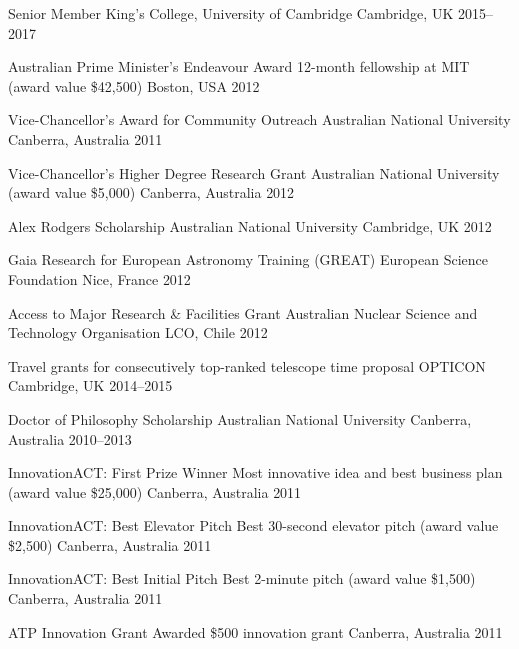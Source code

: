 


\begin{cvhonors}

  \cvhonor
    {Senior Member} 
    {King's College, University of Cambridge}
    {Cambridge, UK}
    {2015--2017} 
    
  \cvhonor
    {Australian Prime Minister's Endeavour Award}
    {12-month fellowship at MIT (award value \$42,500)}
    {Boston, USA}
    {2012}

  \cvhonor
    {Vice-Chancellor's Award for Community Outreach}
    {Australian National University}
    {Canberra, Australia}
    {2011}

  \cvhonor
  	{Vice-Chancellor's Higher Degree Research Grant}
	{Australian National University (award value \$5,000)}
	{Canberra, Australia}
	{2012}
	
  \cvhonor
  	{Alex Rodgers Scholarship}
	{Australian National University}
	{Cambridge, UK}
	{2012}
	
  \cvhonor
  	{Gaia Research for European Astronomy Training (GREAT)}
	{European Science Foundation}
	{Nice, France}
	{2012}
	
  \cvhonor
  	{Access to Major Research \& Facilities Grant}
	{Australian Nuclear Science and Technology Organisation}
	{LCO, Chile}
	{2012}
		
  \cvhonor
  	{Travel grants for consecutively top-ranked telescope time proposal}
	{OPTICON}
	{Cambridge, UK}
	{2014--2015}
	
  \cvhonor
  	{Doctor of Philosophy Scholarship}
	{Australian National University}
	{Canberra, Australia}
	{2010--2013}
	
\end{cvhonors}

\vspace{1em}


\begin{cvhonors}

  \cvhonor
    {InnovationACT: First Prize Winner}
    {Most innovative idea and best business plan (award value \$25,000)}
    {Canberra, Australia}
    {2011}

  \cvhonor
    {InnovationACT: Best Elevator Pitch}
    {Best 30-second elevator pitch (award value \$2,500)}
    {Canberra, Australia}
    {2011}

  \cvhonor
    {InnovationACT: Best Initial Pitch}
    {Best 2-minute pitch (award value \$1,500)}
    {Canberra, Australia}
    {2011}

  \cvhonor
    {ATP Innovation Grant}
    {Awarded \$500 innovation grant}
    {Canberra, Australia}
    {2011}

\end{cvhonors}
